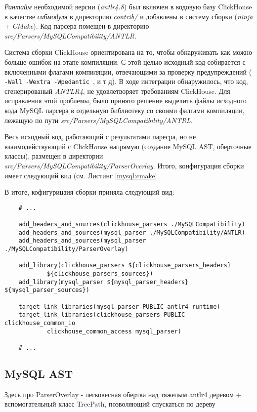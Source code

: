 \textit{Рантайм} необходимой версии (\textit{antlr4.8}) был включен в кодовую базу ClickHouse в качестве \textit{сабмодуля} в директорию \textit{contrib/} и добавлены в систему сборки (\textit{ninja} + \textit{CMake}). Код парсера помещен в директорию\\ \textit{src/Parsers/MySQLCompatibility/ANTLR}.

Система сборки ClickHouse ориентирована на то, чтобы обнаруживать как можно больше ошибок на этапе компиляции. С этой целью исходный код собирается с включенными флагами компиляции, отвечающими за проверку предупреждений (\texttt{ -Wall -Wextra -Wpedantic }, и т д). В ходе интеграции обнаружилось, что код, сгенерированый \textit{ANTLR4}, не удовлетворяет требованиям ClickHouse. Для исправления этой проблемы, было принято решение выделить файлы исходного кода MySQL парсера в отдельную библиотеку со своими фалгами компиляции, лежащую по пути \textit{src/Parsers/MySQLCompatibility/ANTRL}. 

Весь исходный код, работающий с результатами паресра, но не взаимодействующий с ClickHouse напрямую (создание MySQL AST, оберточные классы), размещен в директории \textit{src/Parsers/MySQLCompatibility/ParserOverlay}. Итого, конфигурация сборки имеет следующий вид (см. Листинг \ref{mysql:cmake}

В итоге, кофигурицаия сборки приняла следующий вид:
\begin{code}
    \label{mysql:cmake}
    \begin{verbatim}
    # ...

    add_headers_and_sources(clickhouse_parsers ./MySQLCompatibility)
    add_headers_and_sources(mysql_parser ./MySQLCompatibility/ANTLR)
    add_headers_and_sources(mysql_parser ./MySQLCompatibility/ParserOverlay)

    add_library(clickhouse_parsers ${clickhouse_parsers_headers}
            ${clickhouse_parsers_sources})
    add_library(mysql_parser ${mysql_parser_headers} ${mysql_parser_sources})

    target_link_libraries(mysql_parser PUBLIC antlr4-runtime)
    target_link_libraries(clickhouse_parsers PUBLIC clickhouse_common_io
            clickhouse_common_access mysql_parser)

    # ...
    \end{verbatim}
\end{code}
\subsection{MySQL AST}
Здесь про ParserOverlay - легковесная обертка над тяжелым antlr4 деревом + вспомогательный класс TreePath, позволяющий спускаться по дереву

\pagebreak
